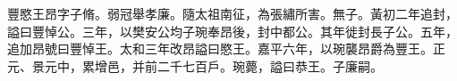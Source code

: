 \begin{pinyinscope}
 
 
 豐愍王昂字子脩。弱冠舉孝廉。隨太祖南征，為張繡所害。無子。黃初二年追封，謚曰豐悼公。三年，以樊安公均子琬奉昂後，封中都公。其年徙封長子公。五年，追加昂號曰豐悼王。太和三年改昂謚曰愍王。嘉平六年，以琬襲昂爵為豐王。正元、景元中，累增邑，并前二千七百戶。琬薨，謚曰恭王。子廉嗣。
 
 
\end{pinyinscope}